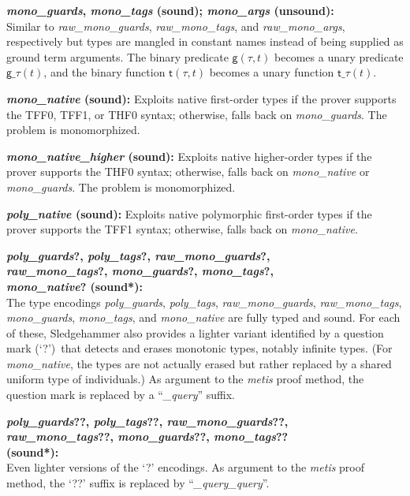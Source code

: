 \documentclass[a4paper,12pt]{article}
\newcommand\const[1]{\textsf{#1}}
\begin{document}
\begin{enum}
\begin{enum}
\item[\labelitemi]
\textbf{%
\textit{mono\_guards}, \textit{mono\_tags} (sound);
\textit{mono\_args} (unsound):} \\
Similar to
\textit{raw\_mono\_guards}, \textit{raw\_mono\_tags}, and
\textit{raw\_mono\_args}, respectively but types are mangled in constant names
instead of being supplied as ground term arguments. The binary predicate
$\const{g}(\tau, t)$ becomes a unary predicate
$\const{g\_}\tau(t)$, and the binary function
$\const{t}(\tau, t)$ becomes a unary function
$\const{t\_}\tau(t)$.

\item[\labelitemi] \textbf{\textit{mono\_native} (sound):} Exploits native
first-order types if the prover supports the TFF0, TFF1, or THF0 syntax;
otherwise, falls back on \textit{mono\_guards}. The problem is monomorphized.

\item[\labelitemi] \textbf{\textit{mono\_native\_higher} (sound):} Exploits
native higher-order types if the prover supports the THF0 syntax; otherwise,
falls back on \textit{mono\_native} or \textit{mono\_guards}. The problem is
monomorphized.

\item[\labelitemi] \textbf{\textit{poly\_native} (sound):} Exploits native
polymorphic first-order types if the prover supports the TFF1 syntax; otherwise,
falls back on \textit{mono\_native}.

\item[\labelitemi]
\textbf{%
\textit{poly\_guards}?, \textit{poly\_tags}?, \textit{raw\_mono\_guards}?, \\
\textit{raw\_mono\_tags}?, \textit{mono\_guards}?, \textit{mono\_tags}?, \\
\textit{mono\_native}? (sound*):} \\
The type encodings \textit{poly\_guards}, \textit{poly\_tags},
\textit{raw\_mono\_guards}, \textit{raw\_mono\_tags}, \textit{mono\_guards},
\textit{mono\_tags}, and \textit{mono\_native} are fully typed and sound. For
each of these, Sledgehammer also provides a lighter variant identified by a
question mark (`\hbox{?}')\ that detects and erases monotonic types, notably
infinite types. (For \textit{mono\_native}, the types are not actually erased
but rather replaced by a shared uniform type of individuals.) As argument to the
\textit{metis} proof method, the question mark is replaced by a
\hbox{``\textit{\_query\/}''} suffix.

\item[\labelitemi]
\textbf{%
\textit{poly\_guards}??, \textit{poly\_tags}??, \textit{raw\_mono\_guards}??, \\
\textit{raw\_mono\_tags}??, \textit{mono\_guards}??, \textit{mono\_tags}?? \\
(sound*):} \\
Even lighter versions of the `\hbox{?}' encodings. As argument to the
\textit{metis} proof method, the `\hbox{??}' suffix is replaced by
\hbox{``\textit{\_query\_query\/}''}.


\end{enum}
\end{enum}
\end{document}
